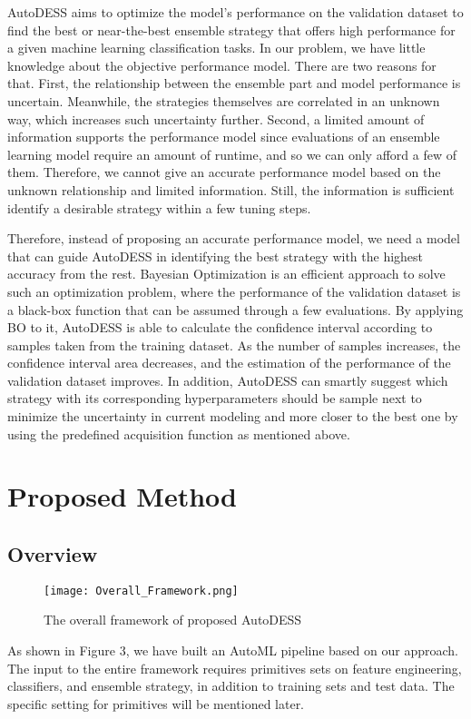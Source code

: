 \documentclass[review]{elsarticle}
\begin{document}
AutoDESS aims to optimize the model's performance on the validation dataset to find the best or near-the-best ensemble strategy that offers high performance for a given machine learning classification tasks. In our problem, we have little knowledge about the objective performance model. There are two reasons for that. First, the relationship between the ensemble part and model performance is uncertain. Meanwhile, the strategies themselves are correlated in an unknown way, which increases such uncertainty further. Second, a limited amount of information supports the performance model since evaluations of an ensemble learning model require an amount of runtime, and so we can only afford a few of them. Therefore, we cannot give an accurate performance model based on the unknown relationship and limited information. Still, the information is sufficient identify a desirable strategy within a few tuning steps.

Therefore, instead of proposing an accurate performance model, we need a model that can guide AutoDESS in identifying the best strategy with the highest accuracy from the rest. Bayesian Optimization is an efficient approach to solve such an optimization problem, where the performance of the validation dataset is a black-box function that can be assumed through a few evaluations. By applying BO to it, AutoDESS is able to calculate the confidence interval according to samples taken from the training dataset. As the number of samples increases, the confidence interval area decreases, and the estimation of the performance of the validation dataset improves. In addition, AutoDESS can smartly suggest which strategy with its corresponding hyperparameters should be sample next to minimize the uncertainty in current modeling and more closer to the best one by using the predefined acquisition function as mentioned above.


\section{Proposed Method}

\subsection{Overview}
\begin{figure}[htbp]
	\centering
	\texttt{[image: Overall\_Framework.png]}
	\caption{The overall framework of proposed AutoDESS}
\end{figure}
As shown in Figure 3, we have built an AutoML pipeline based on our approach. The input to the entire framework requires primitives sets on feature engineering, classifiers, and ensemble strategy, in addition to training sets and test data. The specific setting for primitives will be mentioned later.
\end{document}
